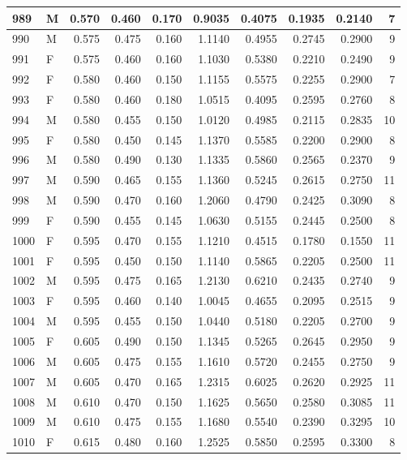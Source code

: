 \documentclass[9pt,twocolumn,twoside,]{pnas-new}
\begin{document}
\begin{tabular}{l|l|r|r|r|r|r|r|r|r}
\hline
989 & M & 0.570 & 0.460 & 0.170 & 0.9035 & 0.4075 & 0.1935 & 0.2140 & 7\\
\hline
990 & M & 0.575 & 0.475 & 0.160 & 1.1140 & 0.4955 & 0.2745 & 0.2900 & 9\\
\hline
991 & F & 0.575 & 0.460 & 0.160 & 1.1030 & 0.5380 & 0.2210 & 0.2490 & 9\\
\hline
992 & F & 0.580 & 0.460 & 0.150 & 1.1155 & 0.5575 & 0.2255 & 0.2900 & 7\\
\hline
993 & F & 0.580 & 0.460 & 0.180 & 1.0515 & 0.4095 & 0.2595 & 0.2760 & 8\\
\hline
994 & M & 0.580 & 0.455 & 0.150 & 1.0120 & 0.4985 & 0.2115 & 0.2835 & 10\\
\hline
995 & F & 0.580 & 0.450 & 0.145 & 1.1370 & 0.5585 & 0.2200 & 0.2900 & 8\\
\hline
996 & M & 0.580 & 0.490 & 0.130 & 1.1335 & 0.5860 & 0.2565 & 0.2370 & 9\\
\hline
997 & M & 0.590 & 0.465 & 0.155 & 1.1360 & 0.5245 & 0.2615 & 0.2750 & 11\\
\hline
998 & M & 0.590 & 0.470 & 0.160 & 1.2060 & 0.4790 & 0.2425 & 0.3090 & 8\\
\hline
999 & F & 0.590 & 0.455 & 0.145 & 1.0630 & 0.5155 & 0.2445 & 0.2500 & 8\\
\hline
1000 & F & 0.595 & 0.470 & 0.155 & 1.1210 & 0.4515 & 0.1780 & 0.1550 & 11\\
\hline
1001 & F & 0.595 & 0.450 & 0.150 & 1.1140 & 0.5865 & 0.2205 & 0.2500 & 11\\
\hline
1002 & M & 0.595 & 0.475 & 0.165 & 1.2130 & 0.6210 & 0.2435 & 0.2740 & 9\\
\hline
1003 & F & 0.595 & 0.460 & 0.140 & 1.0045 & 0.4655 & 0.2095 & 0.2515 & 9\\
\hline
1004 & M & 0.595 & 0.455 & 0.150 & 1.0440 & 0.5180 & 0.2205 & 0.2700 & 9\\
\hline
1005 & F & 0.605 & 0.490 & 0.150 & 1.1345 & 0.5265 & 0.2645 & 0.2950 & 9\\
\hline
1006 & M & 0.605 & 0.475 & 0.155 & 1.1610 & 0.5720 & 0.2455 & 0.2750 & 9\\
\hline
1007 & M & 0.605 & 0.470 & 0.165 & 1.2315 & 0.6025 & 0.2620 & 0.2925 & 11\\
\hline
1008 & M & 0.610 & 0.470 & 0.150 & 1.1625 & 0.5650 & 0.2580 & 0.3085 & 11\\
\hline
1009 & M & 0.610 & 0.475 & 0.155 & 1.1680 & 0.5540 & 0.2390 & 0.3295 & 10\\
\hline
1010 & F & 0.615 & 0.480 & 0.160 & 1.2525 & 0.5850 & 0.2595 & 0.3300 & 8\\

\end{tabular}
\end{document}
